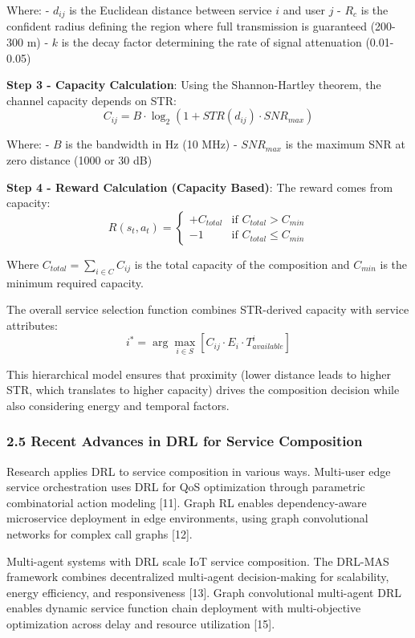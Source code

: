 Where: - \(d_{ij}\) is the Euclidean distance between service \(i\) and
user \(j\) - \(R_c\) is the confident radius defining the region where
full transmission is guaranteed (200-300 m) - \(k\) is the decay factor
determining the rate of signal attenuation (0.01-0.05)

\textbf{Step 3 - Capacity Calculation}: Using the Shannon-Hartley
theorem, the channel capacity depends on STR:
\[C_{ij} = B \cdot \log_2(1 + STR(d_{ij}) \cdot SNR_{max})\]

Where: - \(B\) is the bandwidth in Hz (10 MHz) - \(SNR_{max}\) is the
maximum SNR at zero distance (1000 or 30 dB)

\textbf{Step 4 - Reward Calculation (Capacity Based)}: The reward comes
from capacity:
\[R(s_t, a_t) = \begin{cases} +C_{total} & \text{if } C_{total} > C_{min} \\ -1 & \text{if } C_{total} \leq C_{min} \end{cases}\]

Where \(C_{total} = \sum_{i \in C} C_{ij}\) is the total capacity of the
composition and \(C_{min}\) is the minimum required capacity.

The overall service selection function combines STR-derived capacity
with service attributes:
\[i^* = \arg\max_{i \in S} \left[ C_{ij} \cdot E_i \cdot T_{available}^i \right]\]

This hierarchical model ensures that proximity (lower distance leads to
higher STR, which translates to higher capacity) drives the composition
decision while also considering energy and temporal factors.

\hypertarget{recent-advances-in-drl-for-service-composition}{%
	\subsubsection{2.5 Recent Advances in DRL for Service
		Composition}\label{recent-advances-in-drl-for-service-composition}}

Research applies DRL to service composition in various ways. Multi-user
edge service orchestration uses DRL for QoS optimization through
parametric combinatorial action modeling {[}11{]}. Graph RL enables
dependency-aware microservice deployment in edge environments, using
graph convolutional networks for complex call graphs {[}12{]}.

Multi-agent systems with DRL scale IoT service composition. The DRL-MAS
framework combines decentralized multi-agent decision-making for
scalability, energy efficiency, and responsiveness {[}13{]}. Graph
convolutional multi-agent DRL enables dynamic service function chain
deployment with multi-objective optimization across delay and resource
utilization {[}15{]}.

